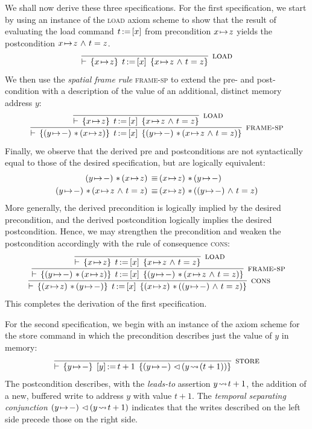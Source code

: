 \documentclass[11pt]{report}
\begin{document}
We shall now derive these three specifications. For the first specification, we start by using an instance of the \textsc{load} axiom scheme to show that the result of evaluating the load command $t \operatorname{:\!=} \left[ x \right]$ from precondition $x \!\mapsto\! z$ yields the postcondition $x \!\mapsto\! z \operatorname{\,\wedge\,} t = z$.
\[ 
  \infer[\textsc{load}]{\triple{x \fpointsto z}{\cload{t}{x}}{x \fpointsto z \conj t = z}}{}
\] We then use the \emph{spatial frame rule} \textsc{frame-sp} to extend the pre- and post-condition with a description of the value of an additional, distinct memory address $y$: \[ 
  \infer[\textsc{frame-sp}]{\triple{(y \fpointsto -) \fsep (x \fpointsto z)}{\cload{t}{x}}{(y \fpointsto -) \fsep (x \fpointsto z \conj t = z)}}{
    \infer[\textsc{load}]{\triple{x \fpointsto z}{\cload{t}{x}}{x \fpointsto z \conj t = z}}{}
  }
\] Finally, we observe that the derived pre and postconditions are not syntactically equal to those of the desired specification, but are logically equivalent: \begin{align*}
(y \fpointsto -) \fsep (x \fpointsto z) \sequiv & (x \fpointsto z) \fsep (y \fpointsto -) \\ 
(y \fpointsto -) \fsep (x \fpointsto z \conj t = z) \sequiv & (x \fpointsto z) \fsep ((y \fpointsto -) \conj t = z)
\end{align*} More generally, the derived precondition is logically implied by the desired precondition, and the derived postcondition logically implies the desired postcondition. Hence, we may strengthen the precondition and weaken the postcondition accordingly with the rule of consequence \textsc{cons}: \[ 
  \infer[\textsc{cons}]{\triple{(x \fpointsto z) \fsep (y \fpointsto -)}{\cload{t}{x}}{(x \fpointsto z) \fsep ((y \fpointsto -) \conj t = z)}}{
    \infer[\textsc{frame-sp}]{\triple{(y \fpointsto -) \fsep (x \fpointsto z)}{\cload{t}{x}}{(y \fpointsto -) \fsep (x \fpointsto z \conj t = z)}}{
      \infer[\textsc{load}]{\triple{x \fpointsto z}{\cload{t}{x}}{x \fpointsto z \conj t = z}}{}
    }
  }
\] This completes the derivation of the first specification. 

For the second specification, we begin with an instance of the axiom scheme for the store command in which the precondition describes just the value of $y$ in memory: \[ \infer[\textsc{store}]{\triple{y \fpointsto -}{\cstore{y}{t+1}}{(y \fpointsto -) \fseq (y \fwriteu (t+1))}}{}\] The postcondition describes, with the \emph{leads-to} assertion $y \!\leadsto\!  t+1$, the addition of a new, buffered write to address $y$ with value $t+1$. The \emph{temporal separating conjunction} $(y \!\mapsto\! -) \operatorname{\,\vartriangleleft\,} (y \!\leadsto\! t+1)$ indicates that the writes described on the left side precede those on the right side. 
\end{document}
